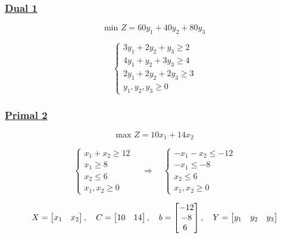 \newpage
\subsubsection*{\underline{Dual 1}}
\[\text{min } Z = 60y_1 + 40y_2 + 80y_3\]

\[
\left\{
\begin{array}{l}
    3y_{1} + 2y_{2} + y_{3} \geq 2 \\
    4y_{1} + y_{2} + 3y_{3} \geq 4 \\
    2y_{1} + 2y_{2} + 2y_{3} \geq 3 \\
    y_{1}, y_{2}, y_{3}\geq 0
\end{array}
\right.
\]

\vspace{1.5cm}
\subsubsection*{\underline{Primal 2}}

\vspace{0.25cm}
\[\text{max } Z = 10x_1 + 14x_2 \]

\[
\left\{
\begin{array}{l}
        x_{1} + x_{2} \geq 12 \\[2pt]
        x_{1} \geq 8 \\[2pt]
        x_{2} \leq 6 \\[2pt]
        x_{1}, x_{2}\geq 0
\end{array}
\right.
\quad\Longrightarrow\quad
\left\{
\begin{array}{l}
        -x_{1} - x_{2}\leq -12 \\[2pt]
        -x_{1} \leq -8 \\[2pt]
        x_{2} \leq 6 \\[2pt]
        x_{1}, x_{2}\geq 0
\end{array}
\right.
\]

\vspace{1cm}
\[
X = \left[\begin{matrix} x_1 & x_2\end{matrix}\right], \hspace{0.35cm}
C = \left[\begin{matrix} 10 & 14  \end{matrix}\right], \hspace{0.35cm}
b = \left[\begin{matrix} -12 \\ -8\\6 \ \end{matrix}\right], \hspace{0.35cm}
Y = \left[\begin{matrix} y_1 & y_2 & y_3 \end{matrix}\right]
\]

